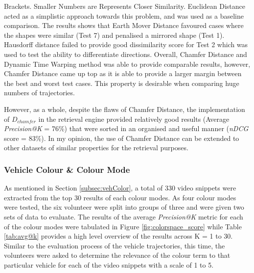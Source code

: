 \begin{landscape}
\begin{table}[]
{  Brackets. Smaller Numbers are Represents Closer Similarity. Euclidean Distance
  acted as a simplistic approach towards this problem, and was used as a
  baseline comparison. The results shows that Earth Mover Distance favoured
  cases where the shapes were similar (Test 7) and penalised a mirrored shape
  (Test 1). Hausdorff distance failed to provide good dissimilarity score for
  Test 2 which was used to test the ability to differentiate directions.
  Overall, Chamfer Distance and Dynamic Time Warping method was able to provide
  comparable results, however, Chamfer Distance came up top as it is able to
  provide a larger margin between the best and worst test cases. This property
  is desirable when comparing huge numbers of trajectories.}
\label{table:DistanceCompare}

\end{table}
\end{landscape}


However, as a whole, despite the flaws of Chamfer Distance, the implementation
of $D_{chamfer}$ in the retrieval engine provided relatively good results
(Average \textit{Precision@K} = 76\%) that were sorted in an organised and
useful manner (\textit{nDCG} score = 83\%). In my opinion, the use of Chamfer
Distance can be extended to other datasets of similar properties for the
retrieval purposes.

\subsubsection{Vehicle Colour \& Colour Mode}
\label{subsec:vehiclecolourchamferdistanceexperiment}

As mentioned in Section \ref{subsec:vehColor}, a total of 330 video snippets
were extracted from the top 30 results of each colour modes.  As four colour
modes were tested, the six volunteer were split into groups of three and were
given two sets of data to evaluate. The results of the average
\textit{Precision@K} metric for each of the colour modes were tabulated in
Figure \ref{fig:colorspace_score} while Table \ref{tab:avg@k} provides a high
level overview of the results across K = 1 to 30. Similar to the evaluation
process of the vehicle trajectories, this time, the volunteers were asked to
determine the relevance of the colour term to that particular vehicle for each
of the video snippets with a scale of 1 to 5.

